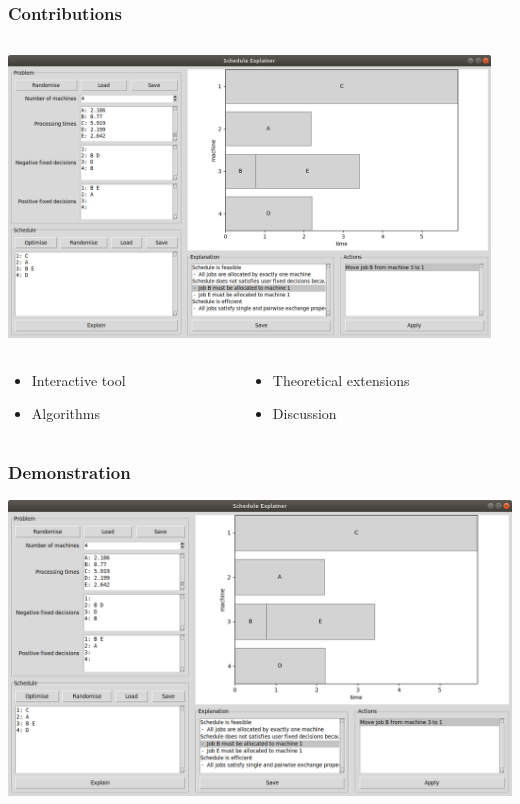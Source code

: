 \documentclass[11pt]{beamer}
\begin{document}
	\begin{frame}
		\frametitle{Contributions}
		\begin{columns}
			\begin{column}{0.5\textwidth}
				\includegraphics[width=\textwidth]{figures/tool_gui.png}
			\end{column}
			\begin{column}{0.5\textwidth}
				\resizebox{\textwidth}{!}{}
			\end{column}
		\end{columns}

		\begin{columns}
			\begin{column}{0.5\textwidth}
				\begin{itemize}
					\item Interactive tool
					\item Algorithms
				\end{itemize}
			\end{column}
			\begin{column}{0.5\textwidth}
				\begin{itemize}
					\item Theoretical extensions 
					\item Discussion
				\end{itemize}
			\end{column}
		\end{columns}			
	\end{frame}

	\begin{frame}
		\frametitle{Demonstration}
		\includegraphics[width=\textwidth]{figures/tool_gui.png}
	\end{frame}
\end{document}
